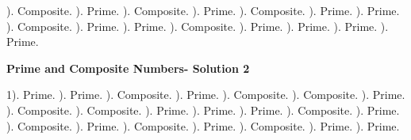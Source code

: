 \documentclass{article}%
\begin{document}
). Composite.%
). Prime.%
). Composite.%
). Prime.%
). Composite.%
). Prime.%
). Prime.%
). Composite.%
). Prime.%
). Prime.%
). Composite.%
). Prime.%
). Prime.%
). Prime.%
). Prime.%
\newline%
\newpage%
\large%
\begin{center}%
\textbf{Prime and Composite Numbers- Solution 2}%
\newline%
\end{center} \normalsize%
1). Prime.%
). Prime.%
). Composite.%
). Prime.%
). Composite.%
). Composite.%
). Prime.%
). Composite.%
). Composite.%
). Prime.%
). Prime.%
). Prime.%
). Composite.%
). Prime.%
). Composite.%
). Prime.%
). Composite.%
). Prime.%
). Composite.%
). Prime.%
). Prime.%
\newline%
\end{document}

